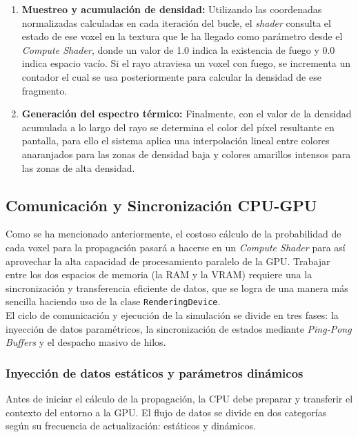 \begin{enumerate}
                \item \textbf{Muestreo y acumulación de densidad:} Utilizando las coordenadas normalizadas calculadas en cada iteración del bucle, el \textit{shader} consulta el estado de ese voxel en la textura que le ha llegado como parámetro desde el \textit{Compute Shader}, donde un valor de 1.0 indica la existencia de fuego y 0.0 indica espacio vacío. Si el rayo atraviesa un voxel con fuego, se incrementa un contador el cual se usa posteriormente para calcular la densidad de ese fragmento.
                
                \item \textbf{Generación del espectro térmico:} Finalmente, con el valor de la densidad acumulada a lo largo del rayo se determina el color del píxel resultante en pantalla, para ello el sistema aplica una interpolación lineal entre colores anaranjados para las zonas de densidad baja y colores amarillos intensos para las zonas de alta densidad.
            \end{enumerate}

    \subsection[Sincronización CPU-GPU]{Comunicación y Sincronización CPU-GPU}

        Como se ha mencionado anteriormente, el costoso cálculo de la probabilidad de cada voxel para la propagación pasará a hacerse en un \textit{Compute Shader} para así aprovechar la alta capacidad de procesamiento paralelo de la GPU. Trabajar entre los dos espacios de memoria (la RAM y la VRAM) requiere una  la sincronización y transferencia eficiente de datos, que se logra de una manera más sencilla haciendo uso de la clase \texttt{RenderingDevice}.\\

        El ciclo de comunicación y ejecución de la simulación se divide en tres fases: la inyección de datos paramétricos, la sincronización de estados mediante \textit{Ping-Pong Buffers} y el despacho masivo de hilos.\\

       \subsubsection*{Inyección de datos estáticos y parámetros dinámicos}

            Antes de iniciar el cálculo de la propagación, la CPU debe preparar y transferir el contexto del entorno a la GPU. El flujo de datos se divide en dos categorías según su frecuencia de actualización: estáticos y dinámicos.\\


